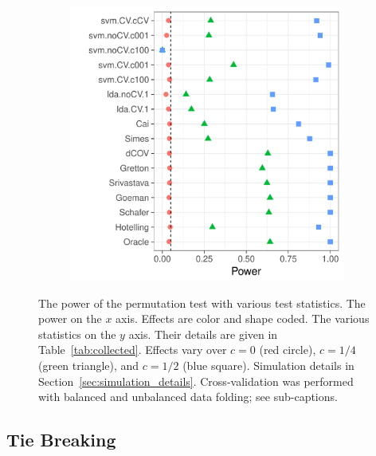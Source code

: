 \documentclass[journal]{IEEEtran}
\begin{document}
\begin{figure}[h]
	\centering
	\begin{subfigure}{.7\columnwidth}
		\centering
		\includegraphics[width=1\columnwidth]{"art/file2"}
		\label{fig:file2}
	\end{subfigure}
	\caption{
		The power of the permutation test with various test statistics. 
		The power on the $x$ axis. 
		Effects are color and shape coded. 
		The various statistics on the $y$ axis. 
		Their details are given in Table~\ref{tab:collected}. 
		Effects vary over $c=0$ (red circle), $c=1/4$ (green triangle), and $c=1/2$ (blue square). 
		Simulation details in Section~\ref{sec:simulation_details}.
		Cross-validation was performed with balanced and unbalanced data folding; see sub-captions.}	
	\label{fig:simulation_1}
\end{figure}



\subsection{Tie Breaking}
\label{sec:ties}
\end{document}
